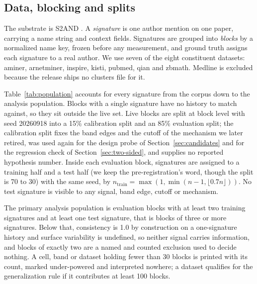 \documentclass[11pt]{article}
\begin{document}
\subsection{Data, blocking and splits}
\label{sec:data}

The substrate is S2AND \citep{s2and2021}. A \emph{signature} is one author
mention on one paper, carrying a name string and context fields. Signatures
are grouped into \emph{blocks} by a normalized name key, frozen before any
measurement, and ground truth assigns each signature to a real author. We use
seven of the eight constituent datasets: aminer, arnetminer, inspire, kisti,
pubmed, qian and zbmath. Medline is excluded because the release ships no
clusters file for it.

Table~\ref{tab:population} accounts for every signature from the corpus down
to the analysis population. Blocks with a single signature have no history to
match against, so they sit outside the live set. Live blocks are split at
block level with seed 20260918 into a 15\% calibration split and an 85\%
evaluation split; the calibration split fixes the band edges and the cutoff
of the mechanism we later retired, was used again for the design probe of
Section~\ref{sec:candidates} and for the regression check of
Section~\ref{sec:two-sided}, and supplies no reported hypothesis number.
Inside each evaluation block, signatures are assigned to a training half and a
test half (we keep the pre-registration's word, though the split is 70 to 30)
with the same seed, by
$n_{\mathrm{train}} = \max(1, \min(n - 1, \lfloor 0.7n \rfloor))$. No test
signature is visible to any signal, band edge, cutoff or mechanism.

The primary analysis population is evaluation blocks with at least two
training signatures and at least one test signature, that is blocks of three
or more signatures. Below that, consistency is 1.0 by construction on a
one-signature history and surface variability is undefined, so neither signal
carries information, and blocks of exactly two are a named and counted
exclusion used to decide nothing. A cell, band or dataset holding fewer than
30 blocks is printed with its count, marked under-powered and interpreted
nowhere; a dataset qualifies for the generalization rule if it contributes at
least 100 blocks.
\end{document}
